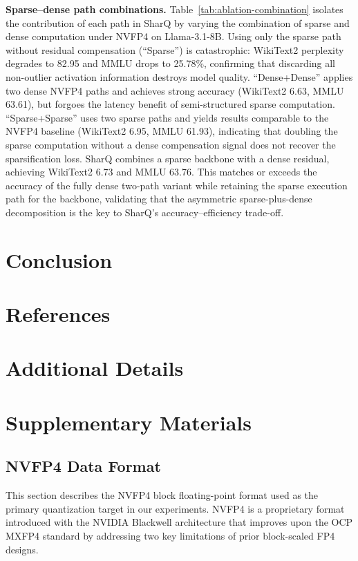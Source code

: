 \documentclass{article}
\begin{document}
\textbf{Sparse--dense path combinations.}
Table~\ref{tab:ablation-combination} isolates the contribution of each path
in SharQ by varying the combination of sparse and dense computation under NVFP4
on Llama-3.1-8B. Using only the sparse path without residual compensation
(``Sparse'') is catastrophic: WikiText2 perplexity degrades to 82.95 and MMLU
drops to 25.78\%, confirming that discarding all non-outlier activation
information destroys model quality. ``Dense+Dense'' applies two dense NVFP4 paths
and achieves strong accuracy (WikiText2 6.63, MMLU 63.61), but forgoes the
latency benefit of semi-structured sparse computation. ``Sparse+Sparse'' uses two
sparse paths and yields results comparable to the NVFP4 baseline (WikiText2 6.95,
MMLU 61.93), indicating that doubling the sparse computation without a dense
compensation signal does not recover the sparsification loss. SharQ combines a
sparse backbone with a dense residual, achieving WikiText2 6.73 and MMLU 63.76.
This matches or exceeds the accuracy of the fully dense two-path variant while
retaining the sparse execution path for the backbone, validating that the
asymmetric sparse-plus-dense decomposition is the key to SharQ's
accuracy--efficiency trade-off.

\section{Conclusion}

\section*{References}

{
\small
}


\appendix
\section{Additional Details}
\section{Supplementary Materials}
\subsection{NVFP4 Data Format}
\label{app:nvfp4}

This section describes the NVFP4 block floating-point format used as the
primary quantization target in our experiments. NVFP4 is a proprietary format
introduced with the NVIDIA Blackwell architecture that improves upon the OCP MXFP4 standard by addressing
two key limitations of prior block-scaled FP4 designs.
\end{document}
